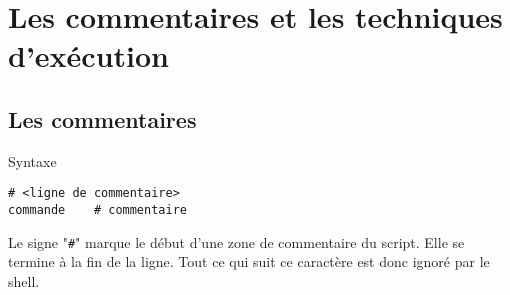 %
%

\setcounter{remarque-cnt}{1}
\setcounter{example-cnt}{1}
\chapter{Les commentaires et les techniques d'ex{\'e}cution}
\thispagestyle{fancy}

\section{\label{commexec-comments}Les commentaires}

\begin{definition}{Syntaxe}
\begin{verbatim}
# <ligne de commentaire>
commande	# commentaire
\end{verbatim}
\end{definition}

Le signe "\verb=#=" marque le d{\'e}but d{'}une zone de commentaire du script.
Elle se termine {\`a} la fin de la ligne. Tout ce qui suit ce caract{\`e}re est donc ignor{\'e} par le shell.


